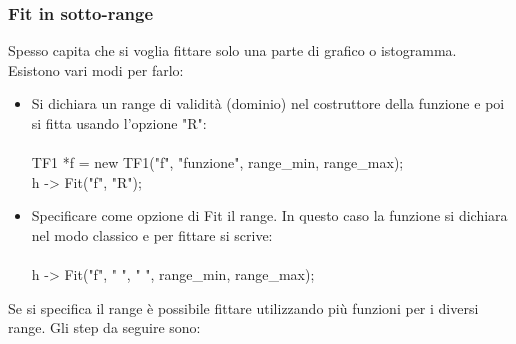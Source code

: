 \documentclass[10pt,a4paper]{article}
\begin{document}
 \subsubsection*{Fit in sotto-range}
 Spesso capita che si voglia fittare solo una parte di grafico o istogramma. Esistono vari modi per farlo:
 \begin{itemize}
 	\item Si dichiara un range di validità (dominio) nel costruttore della funzione e poi si fitta usando l'opzione "R":\\\\
 	TF1 *f = new TF1("f", "funzione", range\_min, range\_max);\\
 	h -> Fit("f", "R");\\
 	\item Specificare come opzione di Fit il range. In questo caso la funzione si dichiara nel modo classico e per fittare si scrive:\\\\
 	h -> Fit("f", " ", " ", range\_min, range\_max); 	
 \end{itemize}
Se si specifica il range è possibile fittare utilizzando più funzioni per i diversi range. Gli step da seguire sono:
\end{document}
